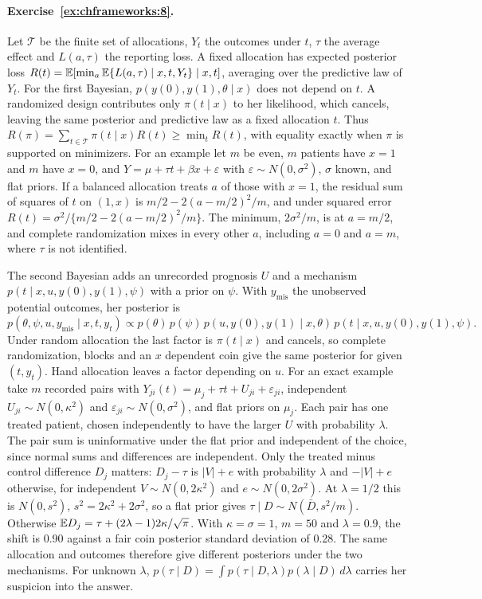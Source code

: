 \paragraph{Exercise~\ref{ex:chframeworks:8}.} Let $\mathcal T$ be the finite set of allocations, $Y_t$ the outcomes under $t$, $\tau$ the average effect and $L(a,\tau)$ the reporting loss. A fixed allocation has expected posterior loss $R(t)=\mathbb{E}[\min_a\mathbb{E}\{L(a,\tau)\mid x,t,Y_t\}\mid x,t]$, averaging over the predictive law of $Y_t$. For the first Bayesian, $p(y(0),y(1),\theta\mid x)$ does not depend on $t$. A randomized design contributes only $\pi(t\mid x)$ to her likelihood, which cancels, leaving the same posterior and predictive law as a fixed allocation $t$. Thus $R(\pi)=\sum_{t\in\mathcal T}\pi(t\mid x)R(t)\ge\min_tR(t)$, with equality exactly when $\pi$ is supported on minimizers. For an example let $m$ be even, $m$ patients have $x = 1$ and $m$ have $x = 0$, and $Y = \mu + \tau t + \beta x + \varepsilon$ with $\varepsilon \sim N(0, \sigma^2)$, $\sigma$ known, and flat priors. If a balanced allocation treats $a$ of those with $x = 1$, the residual sum of squares of $t$ on $(1, x)$ is $m/2 - 2(a - m/2)^2/m$, and under squared error $R(t) = \sigma^2/\{m/2 - 2(a - m/2)^2/m\}$. The minimum, $2\sigma^2/m$, is at $a = m/2$, and complete randomization mixes in every other $a$, including $a = 0$ and $a = m$, where $\tau$ is not identified.

The second Bayesian adds an unrecorded prognosis $U$ and a mechanism $p(t \mid x, u, y(0), y(1), \psi)$ with a prior on $\psi$. With $y_{\mathrm{mis}}$ the unobserved potential outcomes, her posterior is
\[
p(\theta, \psi, u, y_{\mathrm{mis}} \mid x, t, y_t) \propto p(\theta)\,p(\psi)\,p(u, y(0), y(1) \mid x, \theta)\,p(t \mid x, u, y(0), y(1), \psi).
\]
Under random allocation the last factor is $\pi(t\mid x)$ and cancels, so complete randomization, blocks and an $x$ dependent coin give the same posterior for given $(t,y_t)$. Hand allocation leaves a factor depending on $u$. For an exact example take $m$ recorded pairs with $Y_{ji}(t)=\mu_j+\tau t+U_{ji}+\varepsilon_{ji}$, independent $U_{ji}\sim N(0,\kappa^2)$ and $\varepsilon_{ji}\sim N(0,\sigma^2)$, and flat priors on $\mu_j$. Each pair has one treated patient, chosen independently to have the larger $U$ with probability $\lambda$. The pair sum is uninformative under the flat prior and independent of the choice, since normal sums and differences are independent. Only the treated minus control difference $D_j$ matters: $D_j-\tau$ is $|V|+e$ with probability $\lambda$ and $-|V|+e$ otherwise, for independent $V\sim N(0,2\kappa^2)$ and $e\sim N(0,2\sigma^2)$. At $\lambda=1/2$ this is $N(0,s^2)$, $s^2=2\kappa^2+2\sigma^2$, so a flat prior gives $\tau\mid D\sim N(\bar D,s^2/m)$. Otherwise $\mathbb{E} D_j=\tau+(2\lambda-1)2\kappa/\sqrt\pi$. With $\kappa=\sigma=1$, $m=50$ and $\lambda=0.9$, the shift is 0.90 against a fair coin posterior standard deviation of 0.28. The same allocation and outcomes therefore give different posteriors under the two mechanisms. For unknown $\lambda$, $p(\tau\mid D)=\int p(\tau\mid D,\lambda)p(\lambda\mid D)\,d\lambda$ carries her suspicion into the answer.

